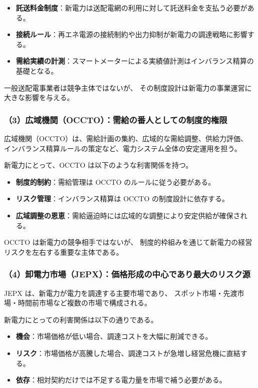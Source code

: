 \begin{itemize}
  \item \textbf{託送料金制度}：新電力は送配電網の利用に対して託送料金を支払う必要がある。
  \item \textbf{接続ルール}：再エネ電源の接続制約や出力抑制が新電力の調達戦略に影響する。
  \item \textbf{需給実績の計測}：スマートメーターによる実績値計測はインバランス精算の基礎となる。
\end{itemize}

一般送配電事業者は競争主体ではないが、
その制度設計は新電力の事業運営に大きな影響を与える。

\subsubsection{（3）広域機関（OCCTO）：需給の番人としての制度的権限}

広域機関（OCCTO）は、需給計画の集約、広域的な需給調整、供給力評価、
インバランス精算ルールの策定など、電力システム全体の安定運用を担う。

新電力にとって、OCCTO は以下のような利害関係を持つ。

\begin{itemize}
  \item \textbf{制度的制約}：需給管理は OCCTO のルールに従う必要がある。
  \item \textbf{リスク管理}：インバランス精算は OCCTO の制度設計に依存する。
  \item \textbf{広域調整の恩恵}：需給逼迫時には広域的な調整により安定供給が確保される。
\end{itemize}

OCCTO は新電力の競争相手ではないが、
制度的枠組みを通じて新電力の経営リスクを左右する重要な主体である。

\subsubsection{（4）卸電力市場（JEPX）：価格形成の中心であり最大のリスク源}

JEPX は、新電力が電力を調達する主要市場であり、
スポット市場・先渡市場・時間前市場など複数の市場で構成される。

新電力にとっての利害関係は以下の通りである。

\begin{itemize}
  \item \textbf{機会}：市場価格が低い場合、調達コストを大幅に削減できる。
  \item \textbf{リスク}：市場価格が高騰した場合、調達コストが急増し経営危機に直結する。
  \item \textbf{依存}：相対契約だけでは不足する電力量を市場で補う必要がある。
\end{itemize}

